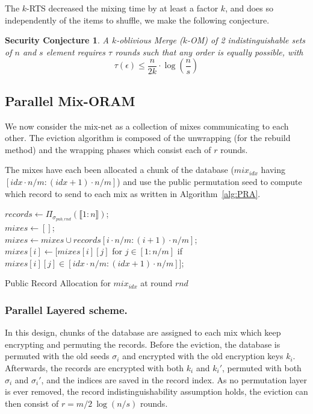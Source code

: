 \documentclass[USenglish,oneside,twocolumn]{article}
\newtheorem{seccjt}{Security Conjecture}
\begin{document}
The $k$-RTS decreased the mixing time by at least a factor $k$, and does so independently of the items to shuffle, we make the following conjecture.

\begin{seccjt}\label{sec:kOM}
A $k$-oblivious Merge ($k$-OM) of 2 indistinguishable sets of $n$ and $s$ element requires $\tau$ rounds such that any order is equally possible, with
$$ \tau(\epsilon) \leq \frac{n}{2k}  \cdot \log \left (\frac{n}{s}\right) $$
\end{seccjt}
%
\subsection{Parallel Mix-ORAM}\label{parallelMixORAM}
%
We now consider the mix-net as a collection of mixes communicating to each other. The eviction algorithm is composed of the unwrapping (for the rebuild method) and the wrapping phases which consist each of $r$ rounds.

The mixes have each been allocated a chunk of the database ($mix_{idx}$ having $[idx\cdot n/m : (idx+1)\cdot n/m]$) and use the public permutation seed to compute which record to send to each mix as written in Algorithm~\ref{alg:PRA}.

\vspace{-.25cm}

\begin{algorithm}
\DontPrintSemicolon
{}
$records \gets {\Pi}_{\sigma_{pub, rnd}}(\llbracket 1 : n \rrbracket)$;\\
$mixes \gets []$;\\
{
	$mixes \gets mixes \cup records[i\cdot n/m : (i+1)\cdot n/m]$;\\
	$mixes[i]\gets [mixes[i][j]$ for $j \in [1:n/m]$ if $mixes[i][j] \in [idx\cdot n/m : (idx+1)\cdot n/m] ]$;\\
}
\caption{Public Record Allocation for $mix_{idx}$ at round $rnd$}
\label{alg:PRA}
\end{algorithm}

\vspace{-1.25cm}

\subsubsection{Parallel Layered scheme.}
In this design, chunks of the database are assigned to each mix which keep encrypting and permuting the records. Before the eviction, the database is permuted with the old seeds $\sigma_i$ and encrypted with the old encryption keys $k_i$. Afterwards, the records are encrypted with both $k_i$ and $k_i'$, permuted with both $\sigma_i$ and $\sigma_i'$, and the indices are saved in the record index. 
As no permutation layer is ever removed, the record indistinguishability assumption holds, the eviction can then consist of $r= m/2 \ \log(n/s)$ rounds. \\
\end{document}
